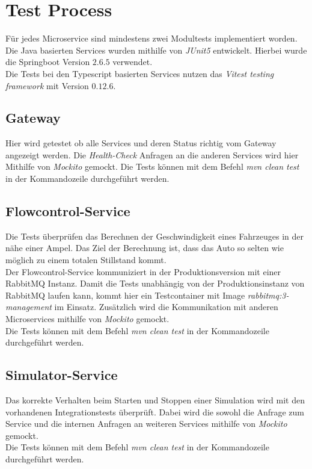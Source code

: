 \section{Test Process}
Für jedes Microservice sind mindestens zwei Modultests implementiert worden.\\
Die Java basierten Services wurden mithilfe von \textit{JUnit5} entwickelt. Hierbei wurde die Springboot Version $2.6.5$ verwendet. \\
Die Tests bei den Typescript basierten Services nutzen das \textit{Vitest testing framework}  mit Version $0.12.6$.\\

\subsection{Gateway}
Hier wird getestet ob alle Services und deren Status richtig vom Gateway angezeigt werden. Die \textit{Health-Check} Anfragen an die anderen Services wird hier Mithilfe von \textit{Mockito} gemockt. 
Die Tests können mit dem Befehl \textit{mvn clean test} in der Kommandozeile durchgeführt werden. 
\subsection{Flowcontrol-Service}
Die Tests überprüfen das Berechnen der Geschwindigkeit eines Fahrzeuges in der nähe einer Ampel. Das Ziel der Berechnung ist, dass das Auto so selten wie möglich zu einem totalen Stillstand kommt.\\ 
Der Flowcontrol-Service kommuniziert in der Produktionsversion mit einer RabbitMQ Instanz. Damit die Tests unabhängig von der Produktionsinstanz von RabbitMQ laufen kann, kommt hier ein Testcontainer mit Image \textit{rabbitmq:3-management} im Einsatz. Zusätzlich wird die Kommunikation mit anderen Microservices mithilfe von \textit{Mockito} gemockt.\\
Die Tests können mit dem Befehl \textit{mvn clean test} in der Kommandozeile durchgeführt werden. 
\subsection{Simulator-Service}
Das korrekte Verhalten beim Starten und Stoppen einer Simulation wird mit den vorhandenen Integrationstests überprüft. Dabei wird die sowohl die Anfrage zum Service und die internen Anfragen an weiteren Services mithilfe von \textit{Mockito} gemockt.\\
Die Tests können mit dem Befehl \textit{mvn clean test} in der Kommandozeile durchgeführt werden. 

